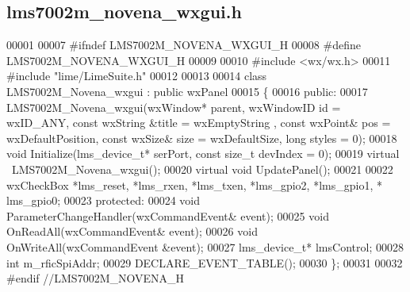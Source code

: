 \subsection{lms7002m\+\_\+novena\+\_\+wxgui.\+h}
\label{lms7002m__novena__wxgui_8h_source}

\begin{DoxyCode}
00001 
00007 \textcolor{preprocessor}{#ifndef LMS7002M\_NOVENA\_WXGUI\_H}
00008 \textcolor{preprocessor}{#define LMS7002M\_NOVENA\_WXGUI\_H}
00009 
00010 \textcolor{preprocessor}{#include <wx/wx.h>}
00011 \textcolor{preprocessor}{#include "lime/LimeSuite.h"}
00012 
00013 
00014 \textcolor{keyword}{class }LMS7002M_Novena_wxgui : \textcolor{keyword}{public} wxPanel
00015 \{
00016 \textcolor{keyword}{public}:
00017     LMS7002M_Novena_wxgui(wxWindow* parent, wxWindowID \textcolor{keywordtype}{id} = wxID\_ANY, \textcolor{keyword}{const} wxString &title = wxEmptyString
      , \textcolor{keyword}{const} wxPoint& pos = wxDefaultPosition, \textcolor{keyword}{const} wxSize& size = wxDefaultSize, \textcolor{keywordtype}{long} styles = 0);
00018     \textcolor{keywordtype}{void} Initialize(lms_device_t* serPort, \textcolor{keyword}{const} \textcolor{keywordtype}{size\_t} devIndex = 0);
00019     \textcolor{keyword}{virtual} ~LMS7002M_Novena_wxgui();
00020     \textcolor{keyword}{virtual} \textcolor{keywordtype}{void} UpdatePanel();
00021 
00022     wxCheckBox *lms_reset, *lms_rxen, *lms_txen, *lms_gpio2, *lms_gpio1, *
      lms_gpio0;
00023 \textcolor{keyword}{protected}:
00024     \textcolor{keywordtype}{void} ParameterChangeHandler(wxCommandEvent& event);
00025     \textcolor{keywordtype}{void} OnReadAll(wxCommandEvent& event);
00026     \textcolor{keywordtype}{void} OnWriteAll(wxCommandEvent &event);
00027     lms_device_t* lmsControl;
00028     \textcolor{keywordtype}{int} m_rficSpiAddr;
00029     DECLARE_EVENT_TABLE();
00030 \};
00031 
00032 \textcolor{preprocessor}{#endif //LMS7002M\_NOVENA\_H}
\end{DoxyCode}
